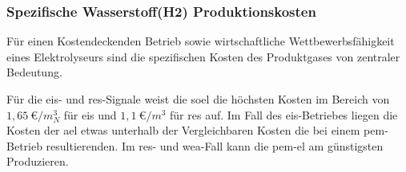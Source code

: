 \documentclass[onecolumn,10pt,titlepage]{article}
\begin{document}
\subsubsection{Spezifische Wasserstoff(H2) Produktionskosten} %
Für einen Kostendeckenden Betrieb sowie wirtschaftliche Wettbewerbsfähigkeit eines Elektrolyseurs sind die spezifischen Kosten des Produktgases von zentraler Bedeutung.

Für die \gls{eis}- und \gls{res}-Signale weist die \gls{soel} die höchsten Kosten im Bereich von $1,65~\euro{}/m^3_N$ für \gls{eis} und $1,1~\euro{}/m^3$ für \gls{res} auf.
Im Fall des \gls{eis}-Betriebes liegen die Kosten der \gls{ael} etwas unterhalb der Vergleichbaren Kosten die bei einem \gls{pem}-Betrieb resultierenden. Im \gls{res}- und \gls{wea}-Fall kann die \gls{pem}-\gls{el} am günstigsten Produzieren. %
\end{document}
